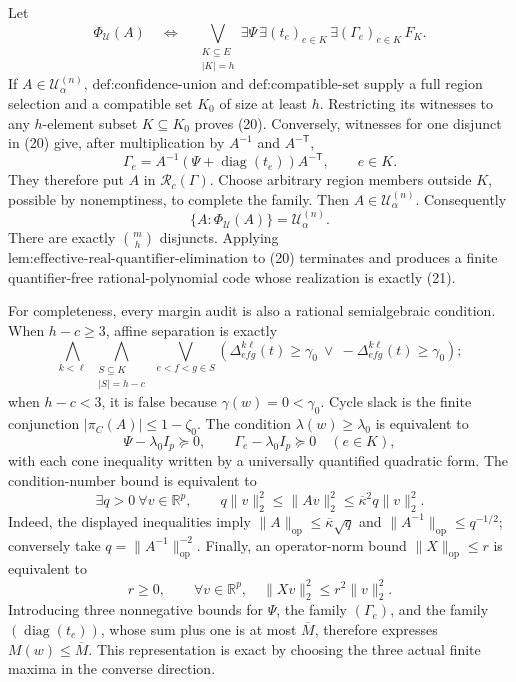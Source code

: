Let
\[
 \Phi_{\mathcal U}(A)
 \quad\Longleftrightarrow\quad
 \bigvee_{\substack{K\subseteq E\\|K|=h}}
 \exists\Psi\,\exists(t_e)_{e\in K}\,\exists(\Gamma_e)_{e\in K}\,F_K.
 \tag{20}
\]
If \(A\in\mathcal U^{(n)}_\alpha\), \(\text{def:confidence-union}\) and \(\text{def:compatible-set}\) supply a full region selection and a compatible set \(K_0\) of size at least \(h\).  Restricting its witnesses to any \(h\)-element subset \(K\subseteq K_0\) proves (20).  Conversely, witnesses for one disjunct in (20) give, after multiplication by \(A^{-1}\) and \(A^{-\mathsf T}\),
\[
 \Gamma_e=A^{-1}(\Psi+\operatorname{diag}(t_e))A^{-\mathsf T},
 \qquad e\in K.
\]
They therefore put \(A\) in \(\mathcal R_c(\Gamma)\).  Choose arbitrary region members outside \(K\), possible by nonemptiness, to complete the family.  Then \(A\in\mathcal U^{(n)}_\alpha\).  Consequently
\[
 \{A:\Phi_{\mathcal U}(A)\}=\mathcal U^{(n)}_\alpha.
 \tag{21}
\]
There are exactly \(\binom mh\) disjuncts.  Applying \(\text{lem:effective-real-quantifier-elimination}\) to (20) terminates and produces a finite quantifier-free rational-polynomial code whose realization is exactly (21).

For completeness, every margin audit is also a rational semialgebraic condition.  When \(h-c\geq3\), affine separation is exactly
\[
 \bigwedge_{k<\ell}\ \bigwedge_{\substack{S\subseteq K\\|S|=h-c}}
 \ \bigvee_{e<f<g\in S}
 \left(\Delta^{k\ell}_{efg}(t)\geq\gamma _0
 \ \vee\ -\Delta^{k\ell}_{efg}(t)\geq\gamma _0\right);
\]
when \(h-c<3\), it is false because \(\gamma(w)=0<\gamma _0\).  Cycle slack is the finite conjunction \(|\pi_C(A)|\leq1-\zeta _0\).  The condition \(\lambda(w)\geq\lambda _0\) is equivalent to
\[
 \Psi-\lambda _0I_p\succeq0,
 \qquad \Gamma_e-\lambda _0I_p\succeq0\quad(e\in K),
\]
with each cone inequality written by a universally quantified quadratic form.  The condition-number bound is equivalent to
\[
 \exists q>0\ \forall v\in\mathbb R^p,\qquad
 q\|v\|_2^2\leq\|Av\|_2^2
 \leq\overline\kappa^2q\|v\|_2^2.
\]
Indeed, the displayed inequalities imply \(\|A\|_{\mathrm{op}}\leq\overline\kappa\sqrt q\) and \(\|A^{-1}\|_{\mathrm{op}}\leq q^{-1/2}\); conversely take \(q=\|A^{-1}\|_{\mathrm{op}}^{-2}\).  Finally, an operator-norm bound \(\|X\|_{\mathrm{op}}\leq r\) is equivalent to
\[
 r\geq0,
 \qquad
 \forall v\in\mathbb R^p,\quad \|Xv\|_2^2\leq r^2\|v\|_2^2.
\]
Introducing three nonnegative bounds for \(\Psi\), the family \((\Gamma_e)\), and the family \((\operatorname{diag}(t_e))\), whose sum plus one is at most \(\overline M\), therefore expresses \(M(w)\leq\overline M\).  This representation is exact by choosing the three actual finite maxima in the converse direction.

